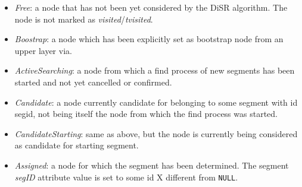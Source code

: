 \begin{itemize}
\item{\emph{Free}}: a node that has  not been yet considered  by the DiSR algorithm.
The node is not marked as \emph{visited}/\emph{tvisited}.
\item{\emph{Boostrap}}: a node which has been explicitly set as bootstrap node from
an upper layer via. 

\item{\emph{ActiveSearching}}: a node from which a find process of new segments has
been started and not yet cancelled or confirmed. 
\item{\emph{Candidate}}: a node currently candidate for belonging to some segment
with id segid, not being itself the node from which the find process
was started. 

\item{\emph{CandidateStarting}}: same as above, but the node is currently being considered as candidate
for starting segment. 

\item{\emph{Assigned}}: a node for which the segment has been determined.  The
segment \emph{segID} attribute value is set to some id X different from \texttt{NULL}.
\end{itemize}



